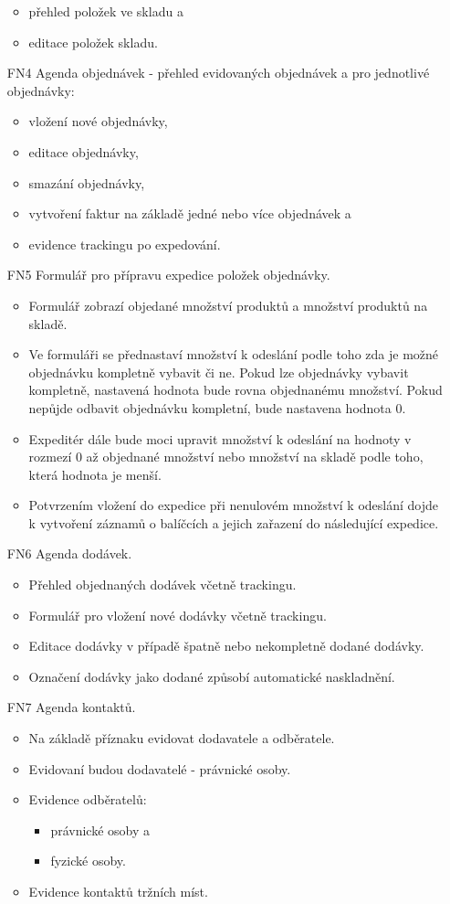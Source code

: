 \documentclass[thesis=B,czech]{FITthesis}[2012/06/26]
\begin{document}
\begin{enumerate}
\begin{itemize}
			\item přehled položek ve skladu a
			\item editace položek skladu.
		\end{itemize}
	\item[FN4] Agenda objednávek - přehled evidovaných objednávek a pro jednotlivé objednávky:
	\begin{itemize}
		\item vložení nové objednávky,
		\item editace objednávky,
		\item smazání objednávky,
		\item vytvoření faktur na základě jedné nebo více objednávek a
		\item evidence trackingu po expedování.
	\end{itemize}
	\item[FN5] Formulář pro přípravu expedice položek objednávky.
	\begin{itemize}
		\item Formulář zobrazí objedané množství produktů a množství produktů na skladě. 
		\item Ve formuláři se přednastaví množství k odeslání podle toho zda je možné objednávku kompletně vybavit či ne. Pokud lze objednávky vybavit kompletně, nastavená hodnota bude rovna objednanému množství. Pokud nepůjde odbavit objednávku kompletní, bude nastavena hodnota 0.
		\item Expeditér dále bude moci upravit množství k odeslání na hodnoty v rozmezí 0 až objednané množství nebo množství na skladě podle toho, která hodnota je menší.
		\item Potvrzením vložení do expedice při nenulovém množství k odeslání dojde k vytvoření záznamů o balíčcích a jejich zařazení do následující expedice.
	\end{itemize}
	\item[FN6] Agenda dodávek.
	\begin{itemize}
		\item Přehled objednaných dodávek včetně trackingu.
		\item Formulář pro vložení nové dodávky včetně trackingu.
		\item Editace dodávky v případě špatně nebo nekompletně dodané dodávky.
		\item Označení dodávky jako dodané způsobí automatické naskladnění.
	\end{itemize}
	\item[FN7] Agenda kontaktů.
	\begin{itemize}
		\item Na základě příznaku evidovat dodavatele a odběratele.
		\item Evidovaní budou dodavatelé - právnické osoby.
		\item Evidence odběratelů:
		\begin{itemize}
			\item právnické osoby a
			\item fyzické osoby.
		\end{itemize}
		\item Evidence kontaktů tržních míst.
	\end{itemize}


\end{enumerate}
\end{document}
